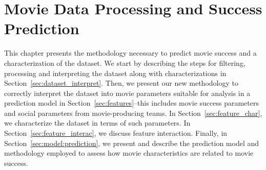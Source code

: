 \chapter{Movie Data Processing and Success Prediction}
\label{chapter:model}
This chapter presents the methodology necessary to predict movie success and a
characterization of the dataset. We start by describing the steps for
filtering, processing and interpreting the dataset along with characterizations
in Section~\ref{sec:dataset_interpret}. Then, we present our new methodology to
correctly interpret the dataset into movie parameters suitable for analysis in
a prediction model in Section~\ref{sec:features}–this includes movie success
parameters and social parameters from movie-producing teams. In
Section~\ref{sec:feature_char}, we characterize the dataset in terms of such
parameters. In Section~\ref{sec:feature_interac}, we discuss feature
interaction. Finally, in Section~\ref{sec:model:prediction}, we present and
describe the prediction model and methodology employed to assess how movie
characteristics are related to movie success.

